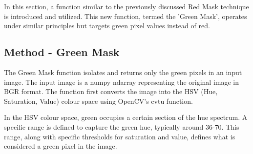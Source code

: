In this section, a function similar to the previously discussed Red Mask technique is introduced and utilized. This new function, termed the 'Green Mask', operates under similar principles but targets green pixel values instead of red.

\subsection*{Method - Green Mask}

The Green Mask function isolates and returns only the green pixels in an input image. The input image is a numpy ndarray representing the original image in BGR format. The function first converts the image into the HSV (Hue, Saturation, Value) colour space using OpenCV's cvtu function.

In the HSV colour space, green occupies a certain section of the hue spectrum. A specific range is defined to capture the green hue, typically around 36-70. This range, along with specific thresholds for saturation and value, defines what is considered a green pixel in the image.

